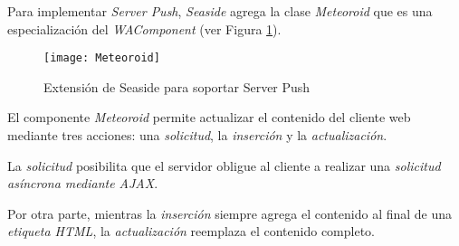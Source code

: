 Para implementar \emph{Server Push}, \emph{Seaside} agrega la clase \emph{Meteoroid} que es una especiali\-zación del \emph{WAComponent} (ver Figura \ref{Meteoroid}).

\begin{figure}[ht!]
\centering
\texttt{[image: Meteoroid]}
\caption{Extensión de Seaside para soportar Server Push}
\label{Meteoroid}
\end{figure}

El componente \emph{Meteoroid} permite actualizar el contenido del cliente web mediante tres acciones: una \emph{solicitud}, la \emph{inserción} y la \emph{actualización}.

La \emph{solicitud} posibilita que el servidor obligue al cliente a realizar una \emph{solicitud asíncrona mediante AJAX}.

Por otra parte, mientras la \emph{inserción} siempre agrega el contenido al final de una \emph{etiqueta HTML}, la \emph{actualización} reemplaza el contenido completo.